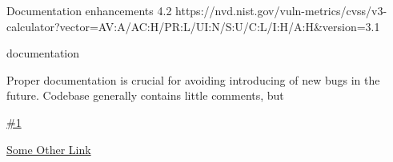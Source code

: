 \vuln
    { %
      Documentation enhancements
    }
    { %
      4.2
    }
    { %
      https://nvd.nist.gov/vuln-metrics/cvss/v3-calculator?vector=AV:A/AC:H/PR:L/UI:N/S:U/C:L/I:H/A:H&version=3.1
    }
    { %
    \item documentation
    }
    { %
    Proper documentation is crucial for avoiding introducing of new bugs in the future.
Codebase generally contains little comments, but  

    }
    { %
      
    }
    { %
    \item\href{github.com}{\#1}
    \item\href{github.com}{Some Other Link}
    }
